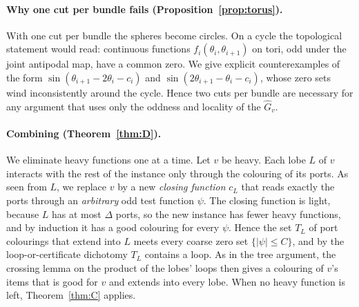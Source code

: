 \documentclass[11pt,letterpaper]{article}
\theoremstyle{definition}
\newcommand{\hG}{\widehat{G}}
\begin{document}
\paragraph{Why one cut per bundle fails (Proposition~\ref{prop:torus}).}
With one cut per bundle the spheres become circles. On a cycle the topological statement would
read: continuous functions $f_i(\theta_i,\theta_{i+1})$ on tori, odd under the joint antipodal map,
have a common zero. We give explicit counterexamples of the form
$\sin(\theta_{i+1}-2\theta_i-c_i)$ and $\sin(2\theta_{i+1}-\theta_i-c_i)$, whose zero sets wind
inconsistently around the cycle. Hence two cuts per bundle are necessary for any argument
that uses only the oddness and locality of the $\hG_v$.

\paragraph{Combining (Theorem~\ref{thm:D}).}
We eliminate heavy functions one at a time. Let $v$ be heavy. Each lobe $L$ of $v$ interacts with
the rest of the instance only through the colouring of its ports. As seen from $L$, we replace $v$
by a new \emph{closing function} $c_L$ that reads exactly the ports through an \emph{arbitrary}
odd test function $\psi$. The closing function is light, because $L$ has at most $\Delta$ ports,
so the new instance has fewer heavy functions, and by induction it has a good colouring for every
$\psi$. Hence the set $T_L$ of port colourings that extend into $L$ meets every coarse zero set
$\{|\psi|\le C\}$, and by the loop-or-certificate dichotomy $T_L$ contains a loop. As in the tree
argument, the crossing lemma on the product of the lobes' loops then gives a colouring of $v$'s
items that is good for $v$ and extends into every lobe. When no heavy function is left,
Theorem~\ref{thm:C} applies.
\end{document}

